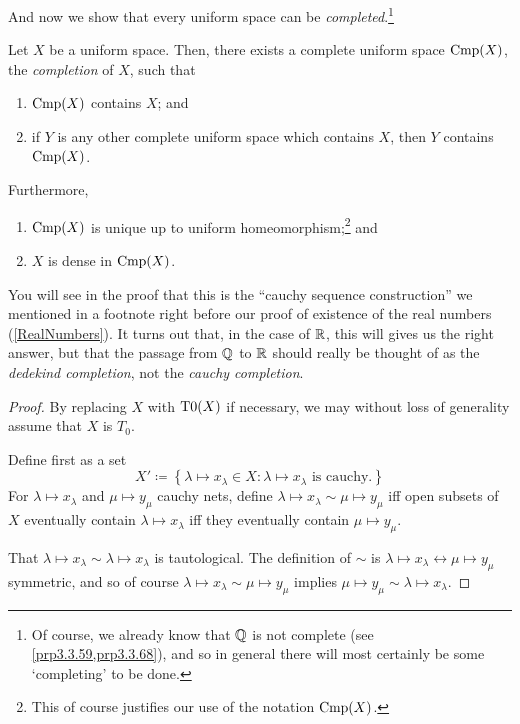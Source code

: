 And now we show that every uniform space can be \emph{completed}.\footnote{Of course, we already know that $\mathbb{Q}$ is not complete (see \cref{prp3.3.59,prp3.3.68}), and so in general there will most certainly be some `completing' to be done.}
\begin{thm}[Completion]\label{Completion}
\begin{savenotes}
Let $X$ be a uniform space.  Then, there exists a complete uniform space $\operatorname{Cmp} (X)$, the \emph{completion} of $X$, such that
\begin{enumerate}
\item $\operatorname{Cmp} (X)$ contains $X$; and
\item if $Y$ is any other complete uniform space which contains $X$, then $Y$ contains $\operatorname{Cmp} (X)$.
\end{enumerate}
Furthermore,
\begin{enumerate}
\item $\operatorname{Cmp} (X)$ is unique up to uniform homeomorphism;\footnote{This of course justifies our use of the notation $\operatorname{Cmp} (X)$.} and
\item $X$ is dense in $\operatorname{Cmp} (X)$.
\end{enumerate}
\begin{rmk}
You will see in the proof that this is the ``cauchy sequence construction'' we mentioned in a footnote right before our proof of existence of the real numbers (\cref{RealNumbers}).  It turns out that, in the case of $\mathbb{R}$, this will gives us the right answer, but that the passage from $\mathbb{Q}$ to $\mathbb{R}$ should really be thought of as the \emph{dedekind completion}, not the \emph{cauchy completion}.
\end{rmk}
\begin{proof}
By replacing $X$ with $\operatorname{T0} (X)$ if necessary, we may without loss of generality assume that $X$ is $T_0$.

\label{stpB.5.6.1}
Define first as a set
\begin{equation}
X'\coloneqq \left\{ \lambda \mapsto x_\lambda \in X:\lambda \mapsto x_\lambda \text{ is cauchy.}\right\} 
\end{equation}
For $\lambda \mapsto x_\lambda$ and $\mu \mapsto y_\mu$ cauchy nets, define $\lambda \mapsto x_\lambda \sim \mu \mapsto y_\mu$ iff open subsets of $X$ eventually contain $\lambda \mapsto x_\lambda$ iff they eventually contain $\mu \mapsto y_\mu$.

That $\lambda \mapsto x_\lambda \sim \lambda \mapsto x_\lambda $ is tautological.  The definition of $\sim$ is $\lambda \mapsto x_\lambda \leftrightarrow \mu \mapsto y_\mu$ symmetric, and so of course $\lambda \mapsto x_\lambda \sim \mu \mapsto y_\mu $ implies $\mu \mapsto y_\mu \sim \lambda \mapsto x_\lambda$.


\end{proof}
\end{savenotes}
\end{thm}
